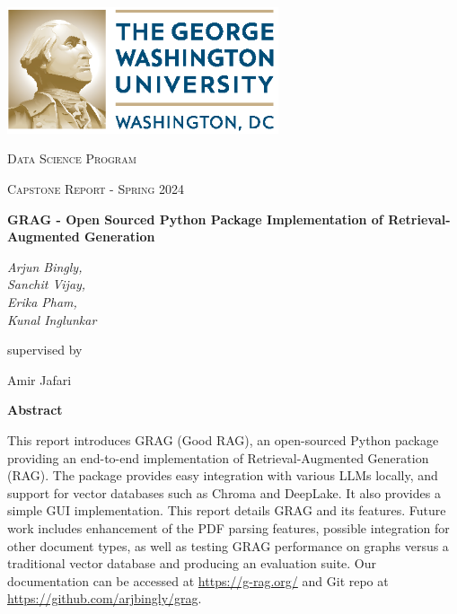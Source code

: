 \documentclass{scrartcl}
\renewenvironment{abstract}{
    \centering
    \textbf{Abstract}
    \vspace{0.5cm}
    \par
    \begin{minipage}{0.7\linewidth}}{\end{minipage}
    \noindent\ignorespaces
}
\begin{document}
\begin{titlepage}
	\centering
	\includegraphics[width=0.6\textwidth]{GW_logo.eps}\par
	\vspace{2cm}
	{\scshape\LARGE Data Science Program \par}
	\vspace{1cm}
	{\scshape\Large Capstone Report - Spring 2024\par}
	\vspace{1.5cm}
	{\huge\bfseries GRAG - Open Sourced Python Package Implementation of Retrieval-Augmented Generation\par}
	\vspace{2cm}
	{\Large\itshape Arjun Bingly,\\ Sanchit Vijay,\\ Erika Pham,\\Kunal Inglunkar}\par
	\vspace{1.5cm}
	supervised by\par
	Amir Jafari

\newpage
	\vfill
	\begin{abstract}
	    This report introduces GRAG (Good RAG), an open-sourced Python package providing an end-to-end implementation of Retrieval-Augmented Generation (RAG).
	    The package provides easy integration with various LLMs locally, and support for vector databases such as Chroma and DeepLake. It also provides a simple GUI implementation. This report details GRAG and its features.
	    Future work includes enhancement of the PDF parsing features, possible integration for other document types, as well as testing GRAG performance on graphs versus a traditional vector database and producing an evaluation suite.
	    Our documentation can be accessed at \url{https://g-rag.org/} and Git repo at \url{https://github.com/arjbingly/grag}.
	\vfill
    \end{abstract}
    \end{titlepage}
\end{document}
